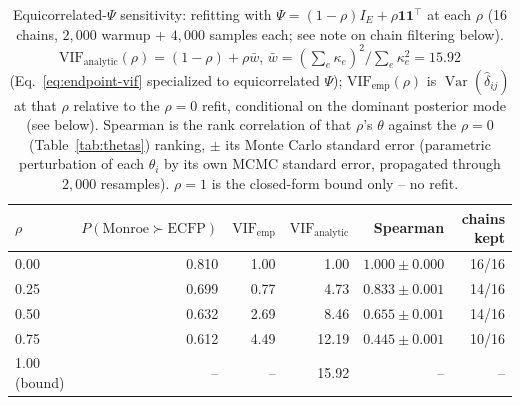 \documentclass{article}
\DeclareMathOperator{\Var}{Var}
\begin{document}
\begin{table}[H]
\centering
\caption{Equicorrelated-$\Psi$ sensitivity: refitting with $\Psi = (1-\rho)I_E + \rho\mathbf{1}\mathbf{1}^\top$ at
each $\rho$ (16 chains, $2{,}000$ warmup + $4{,}000$ samples each; see note on chain filtering below).
$\mathrm{VIF}_{\mathrm{analytic}}(\rho) = (1-\rho) + \rho\bar w$, $\bar w = (\sum_e\kappa_e)^2/\sum_e\kappa_e^2 =
15.92$ (Eq.~\ref{eq:endpoint-vif} specialized to equicorrelated $\Psi$); $\mathrm{VIF}_{\mathrm{emp}}(\rho)$ is
$\Var(\hat\delta_{ij})$ at that $\rho$ relative to the $\rho=0$ refit, conditional on the dominant posterior
mode (see below). Spearman is the rank correlation of that $\rho$'s $\theta$ against the $\rho=0$
(Table~\ref{tab:thetas}) ranking, $\pm$ its Monte Carlo standard error (parametric perturbation of each
$\theta_i$ by its own MCMC standard error, propagated through $2{,}000$ resamples). $\rho=1$ is the closed-form
bound only -- no refit.}
\label{tab:endpoint-psi-sensitivity}
\begin{tabular}{lrrrrr}
\toprule
$\rho$ & $P(\text{Monroe} \succ \text{ECFP})$ & $\mathrm{VIF}_{\mathrm{emp}}$ & $\mathrm{VIF}_{\mathrm{analytic}}$ & Spearman & chains kept \\
\midrule
0.00           & 0.810 & 1.00 & 1.00  & $1.000 \pm 0.000$ & 16/16 \\
0.25           & 0.699 & 0.77 & 4.73  & $0.833 \pm 0.001$ & 14/16 \\
0.50           & 0.632 & 2.69 & 8.46  & $0.655 \pm 0.001$ & 14/16 \\
0.75           & 0.612 & 4.49 & 12.19 & $0.445 \pm 0.001$ & 10/16 \\
1.00 (bound)   & --    & --   & 15.92 & --                & --    \\
\bottomrule
\end{tabular}
\end{table}
\end{document}
